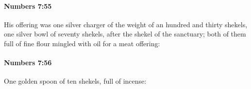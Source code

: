 		\paragraph{Numbers 7:55} %
			\label{NUMBERS-7-55}

			His offering was one silver charger of the weight of an hundred and thirty shekels, one silver bowl of seventy shekels, after the shekel of the sanctuary; both of them full of fine flour mingled with oil for a meat offering:


		\paragraph{Numbers 7:56} %
			\label{NUMBERS-7-56}

			One golden spoon of ten shekels, full of incense:


